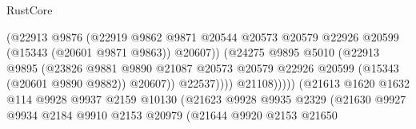 \begin{lexlean}{RustCore}
\begin{coremodule}
                                              (@22913
                                                @9876
                                                (@22919
                                                  @9862
                                                  @9871
                                                  @20544
                                                  @20573
                                                  @20579
                                                  @22926
                                                  @20599
                                                  (@15343 (@20601 @9871 @9863))
                                                  @20607))
                                              (@24275
                                                @9895
                                                @5010
                                                (@22913
                                                  @9895
                                                  (@23826
                                                    @9881
                                                    @9890
                                                    @21087
                                                    @20573
                                                    @20579
                                                    @22926
                                                    @20599
                                                    (@15343 (@20601 @9890 @9882))
                                                    @20607))
                                                @22537))))
                                        @21108)))))
                              (@21613
                                @1620
                                @1632
                                @114
                                @9928
                                @9937
                                @2159
                                @10130
                                (@21623
                                  @9928
                                  @9935
                                  @2329
                                  (@21630
                                    @9927
                                    @9934
                                    @2184
                                    @9910
                                    @2153
                                    @20979
                                    (@21644
                                      @9920
                                      @2153
                                      @21650

\end{coremodule}
\end{lexlean}
